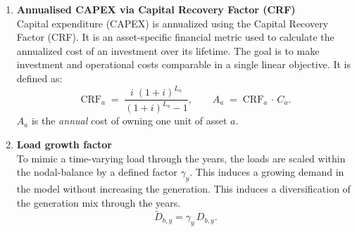 \begin{enumerate}[label=\textbf{\roman*}.]
  \item \textbf{Annualised CAPEX via Capital Recovery Factor (CRF)}\\
        Capital expenditure (CAPEX) is annualized using the Capital Recovery Factor (CRF).  It is an asset-specific financial metric used to calculate the annualized cost of an investment over its lifetime.
        The goal is to make investment and operational costs comparable in a single linear objective. It is defined as:
        \begin{equation}
          \text{CRF}_a \;=\; \frac{i\;(1+i)^{L_a}}{(1+i)^{L_a}-1},
          \qquad
          A_a \;=\; \text{CRF}_a \, \cdot\, C_a.
        \end{equation}
        $A_a$ is the \emph{annual} cost of owning one unit of asset $a$.

  \item \textbf{Load growth factor}\\
        To mimic a time-varying load through the years, the loads are scaled within the nodal-balance by a defined 
        factor $\gamma_y$. This induces a growing demand in the model without increasing the generation. 
        This induces a diversification of the generation mix through the years.
        \[
        \tilde D_{b,y} = \gamma_y\,D_{b,y}.
        \]
\end{enumerate}





